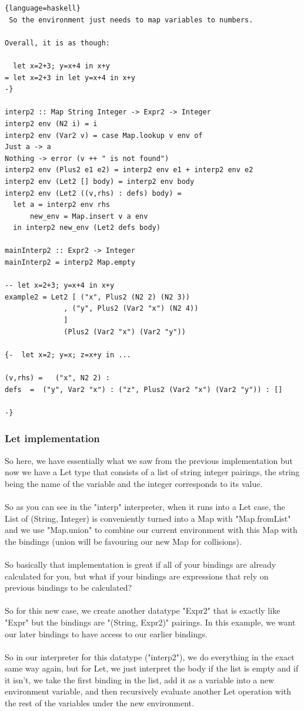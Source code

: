 \documentclass[12pt]{article}
\begin{document}
\begin{lstlisting}{language=haskell}
 So the environment just needs to map variables to numbers.

Overall, it is as though:

  let x=2+3; y=x+4 in x+y
= let x=2+3 in let y=x+4 in x+y
-}

interp2 :: Map String Integer -> Expr2 -> Integer
interp2 env (N2 i) = i
interp2 env (Var2 v) = case Map.lookup v env of
Just a -> a
Nothing -> error (v ++ " is not found")
interp2 env (Plus2 e1 e2) = interp2 env e1 + interp2 env e2
interp2 env (Let2 [] body) = interp2 env body
interp2 env (Let2 ((v,rhs) : defs) body) =
  let a = interp2 env rhs
      new_env = Map.insert v a env
  in interp2 new_env (Let2 defs body)

mainInterp2 :: Expr2 -> Integer
mainInterp2 = interp2 Map.empty

-- let x=2+3; y=x+4 in x+y
example2 = Let2 [ ("x", Plus2 (N2 2) (N2 3))
              , ("y", Plus2 (Var2 "x") (N2 4))
              ]
              (Plus2 (Var2 "x") (Var2 "y"))

{-  let x=2; y=x; z=x+y in ...

(v,rhs) =   ("x", N2 2) :
defs  =  ("y", Var2 "x") : ("z", Plus2 (Var2 "x") (Var2 "y")) : []

-}
\end{lstlisting}

\subsubsection{Let implementation}

So here, we have essentially what we saw from the previous implementation but now we have a Let type that consists of a list of string integer pairings, the string being the name of the variable and the integer corresponds to its value. \\
\\
So as you can see in the "interp" interpreter, when it runs into a Let case, the List of (String, Integer) is conveniently turned into a Map with "Map.fromList" and we use "Map.union" to combine our current environment with this Map with the bindings (union will be favouring our new Map for collisions).\\
\\
So basically that implementation is great if all of your bindings are already calculated for you, but what if your bindings are expressions that rely on previous bindings to be calculated?\\
\\
So for this new case, we create another datatype "Expr2" that is exactly like "Expr" but the bindings are "(String, Expr2)" pairings. In this example, we want our later bindings to have access to our earlier bindings.\\
\\
So in our interpreter for this datatype ("interp2"), we do everything in the exact same way again, but for Let, we just interpret the body if the list is empty and if it isn't, we take the first binding in the list, add it as a variable into a new environment variable, and then recursively evaluate another Let operation with the rest of the variables under the new environment.
\end{document}
